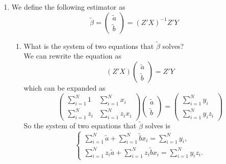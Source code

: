 \documentclass[12pt]{article}
\begin{document}
\begin{flushleft}
\begin{enumerate}
    \item We define the following estimator as
    \[
    \tilde{\beta}=\begin{pmatrix} \tilde{a} \\ \tilde{b} \end{pmatrix}=(Z'X)^{-1}Z'Y
    \]
    \begin{enumerate}
        \item What is the system of two equations that $\tilde{\beta}$ solves?\\
        We can rewrite the equation as
        \[
        (Z'X)\begin{pmatrix} \tilde{a} \\ \tilde{b} \end{pmatrix}=Z'Y
        \]
        which can be expanded as
        \[
        \begin{pmatrix} \sum_{i=1}^N 1 & \sum_{i=1}^N x_i \\ \sum_{i=1}^N z_i & \sum_{i=1}^N z_i x_i \end{pmatrix}\begin{pmatrix} \tilde{a} \\ \tilde{b} \end{pmatrix}=\begin{pmatrix} \sum_{i=1}^N y_i \\ \sum_{i=1}^N y_iz_i \end{pmatrix}
        \]
        So the system of two equations that $\tilde{\beta}$ solves is
        \[
        \begin{cases}
        \displaystyle
        \sum_{i=1}^N \tilde{a} + \sum_{i=1}^N \tilde{b}x_i = \sum_{i=1}^N y_i,\\[6pt]
        \displaystyle
        \sum_{i=1}^N z_i\tilde{a} + \sum_{i=1}^N z_i\tilde{b}x_i = \sum_{i=1}^N y_iz_i.
        \end{cases}
        \]


\end{enumerate}
\end{enumerate}
\end{flushleft}
\end{document}
